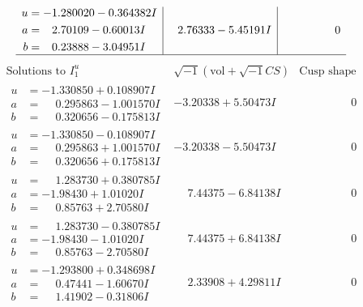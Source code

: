 \documentclass[1p]{elsarticle_modified}
\theoremstyle{definition}
\newcommand{\I}{\sqrt{-1}}
\begin{document}
$$\begin{array}{c|c|c}
\begin{aligned}
u &= -1.280020 - 0.364382 I \\
a &= \phantom{-}2.70109 - 0.60013 I \\
b &= \phantom{-}0.23888 - 3.04951 I\end{aligned}
 & \phantom{-}2.76333 - 5.45191 I & \phantom{-0.000000 } 0\\
 \hline 
 \end{array}$$\newpage$$\begin{array}{c|c|c}  
\text{Solutions to }I^u_{1}& \I (\text{vol} + \sqrt{-1}CS) & \text{Cusp shape}\\
 \hline 
\begin{aligned}
u &= -1.330850 + 0.108907 I \\
a &= \phantom{-}0.295863 - 1.001570 I \\
b &= \phantom{-}0.320656 - 0.175813 I\end{aligned}
 & -3.20338 + 5.50473 I & \phantom{-0.000000 } 0 \\ \hline\begin{aligned}
u &= -1.330850 - 0.108907 I \\
a &= \phantom{-}0.295863 + 1.001570 I \\
b &= \phantom{-}0.320656 + 0.175813 I\end{aligned}
 & -3.20338 - 5.50473 I & \phantom{-0.000000 } 0 \\ \hline\begin{aligned}
u &= \phantom{-}1.283730 + 0.380785 I \\
a &= -1.98430 + 1.01020 I \\
b &= \phantom{-}0.85763 + 2.70580 I\end{aligned}
 & \phantom{-}7.44375 - 6.84138 I & \phantom{-0.000000 } 0 \\ \hline\begin{aligned}
u &= \phantom{-}1.283730 - 0.380785 I \\
a &= -1.98430 - 1.01020 I \\
b &= \phantom{-}0.85763 - 2.70580 I\end{aligned}
 & \phantom{-}7.44375 + 6.84138 I & \phantom{-0.000000 } 0 \\ \hline\begin{aligned}
u &= -1.293800 + 0.348698 I \\
a &= \phantom{-}0.47441 - 1.60670 I \\
b &= \phantom{-}1.41902 - 0.31806 I\end{aligned}
 & \phantom{-}2.33908 + 4.29811 I & \phantom{-0.000000 } 0 \\ \hline\begin{aligned}

\end{aligned}
\end{array}$$
\end{document}
